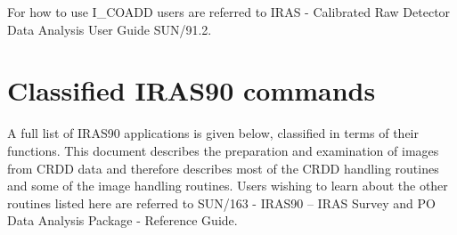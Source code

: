 For how to use I\_COADD users are referred to IRAS - Calibrated Raw Detector
Data Analysis User Guide SUN/91.2.
 
\section{Classified IRAS90 commands}
\label{m:otheriras90}

A full list of {\small IRAS90} applications is given below, classified in terms
of their functions. This document describes the preparation and examination
of images from CRDD data and therefore describes most of the CRDD handling
routines and some of the image handling routines. Users wishing to learn about
the other routines listed here are referred to SUN/163 - IRAS90 -- IRAS Survey
and PO Data Analysis Package - Reference Guide.

